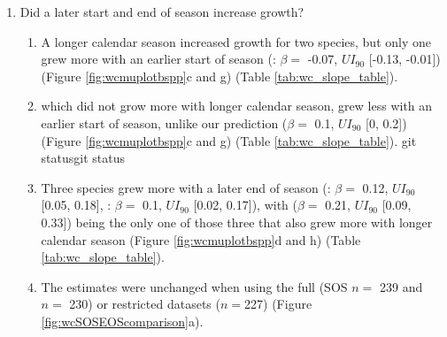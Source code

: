 \begin{enumerate}
\begin{enumerate}
  \item {\Ainc} grew more with longer calendar seasons ($\beta = $ 
  0.05, $UI_{90}$
  [0, 
  0.1]), but of the three species that responded to thermal season, only {\Bpap} also grew more with longer calendar seasons ($\beta = $ 
  0.18, $UI_{90}$
  [0.05, 
  0.31]).
  \item {\Ball} ($\beta = $ 
  0.03, $UI_{90}$
  [-0.03, 
  0.09]), and {\Bpop} ($\beta = $ 
  0.05, $UI_{90}$
  [-0.02, 
  0.13]) trended in the same direction (Figure \ref{fig:wcmuplotbspp}b and f) (Table \ref{tab:wc_slope_table}).
  
  \item Results with basal area increment (BAI) for the GDD model were broadly similar to ring width (see Table \ref{tab:BAItab}) 
  
  \item On a scaled axis, both predictors were similarly predictive (Figure\ref{fig:bsppZscored}). 
  \end{enumerate}
  
\item Did a later start and end of season increase growth?
  \begin{enumerate}
  \item A longer calendar season increased growth for two species, but only one grew more with an earlier start of season ({\Ainc}: $\beta = $ 
  -0.07, $UI_{90}$
  [-0.13, 
  -0.01]) (Figure \ref{fig:wcmuplotbspp}c and g) (Table \ref{tab:wc_slope_table}).
  
  \item {\Ball} which did not grow more with longer calendar season, grew less with an earlier start of season, unlike our prediction ($\beta = $ 
  0.1, $UI_{90}$
  [0, 
  0.2]) (Figure \ref{fig:wcmuplotbspp}c and g) (Table \ref{tab:wc_slope_table}).
  git statusgit status
  \item Three species grew more with a later end of season ({\Ball}: $\beta = $ 
  0.12, $UI_{90}$
  [0.05, 
  0.18], 
  {\Bpop}: $\beta = $ 
  0.1, $UI_{90}$
  [0.02, 
  0.17]), with {\Bpap} 
  ($\beta = $ 
  0.21, $UI_{90}$
  [0.09, 
  0.33])
  being the only one of those three that also grew more with longer calendar season (Figure \ref{fig:wcmuplotbspp}d and h) (Table \ref{tab:wc_slope_table}).
  
  \item The estimates were unchanged when using the full (SOS $n =$ 239 and $n =$ 230) or restricted datasets ($n=$227) (Figure \ref{fig:wcSOSEOScomparison}a). 
  

\end{enumerate}
\end{enumerate}
